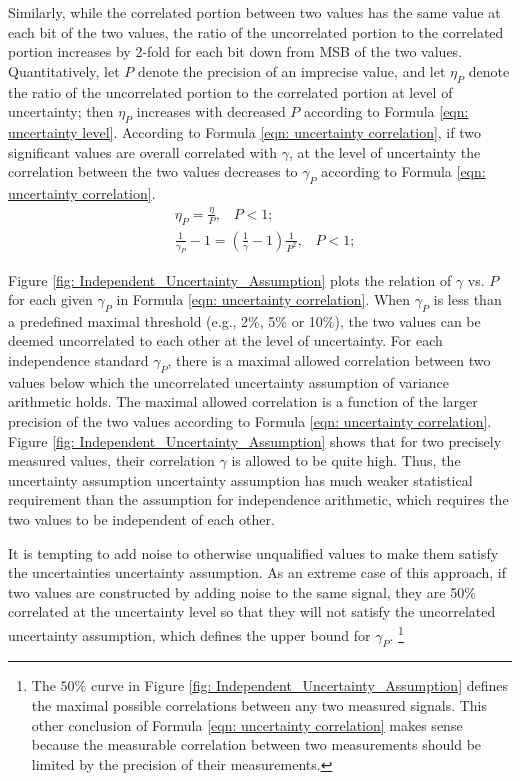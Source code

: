 \documentclass[twoside]{article}
\numberwithin{equation}{section}
\newcommand{\eqspace}{\;\;\;}
\begin{document}
Similarly, while the correlated portion between two values has the same value at each bit of the two values, the ratio of the uncorrelated portion to the correlated portion increases by 2-fold for each bit down from MSB of the two values. 
Quantitatively, let $P$ denote the precision of an imprecise value, and let $\eta_{P}$ denote the ratio of the uncorrelated portion to the correlated portion at level of uncertainty; then $\eta_{P}$ increases with decreased $P$ according to Formula \eqref{eqn: uncertainty level}. 
According to Formula \eqref{eqn: uncertainty correlation}, if two significant values are overall correlated with $\gamma$, at the level of uncertainty the correlation between the two values decreases to $\gamma_P$ according to Formula \eqref{eqn: uncertainty correlation}.
\begin{align}
\label{eqn: uncertainty level}
& \eta_{P} = \frac{\eta}{P}, \eqspace P < 1; \\
\label{eqn: uncertainty correlation}
& \frac{1}{\gamma_{P}} - 1 = \left(\frac{1}{\gamma} -1\right) \frac{1}{P^2}, \eqspace P < 1;
\end{align}

Figure \ref{fig: Independent_Uncertainty_Assumption} plots the relation of $\gamma$ vs. $P$ for each given $\gamma_{P}$ in Formula \eqref{eqn: uncertainty correlation}.  
When $\gamma_{P}$ is less than a predefined maximal threshold (e.g., 2\%, 5\% or 10\%), the two values can be deemed uncorrelated to each other at the level of uncertainty.  
For each independence standard $\gamma_{P}$, there is a maximal allowed correlation between two values below which the uncorrelated uncertainty assumption of variance arithmetic holds.  
The maximal allowed correlation is a function of the larger precision of the two values according to Formula \eqref{eqn: uncertainty correlation}.  
Figure \ref{fig: Independent_Uncertainty_Assumption} shows that for two precisely measured values, their correlation $\gamma$ is allowed to be quite high.  
Thus, the uncertainty assumption uncertainty assumption has much weaker statistical requirement than the assumption for independence arithmetic, which requires the two values to be independent of each other.

It is tempting to add noise to otherwise unqualified values to make them satisfy the uncertainties uncertainty assumption.  
As an extreme case of this approach, if two values are constructed by adding noise to the same signal, they are 50\% correlated at the uncertainty level so that they will not satisfy the uncorrelated uncertainty assumption, which defines the upper bound for $\gamma_{P}$. 
\footnote{
The $50\%$ curve in Figure \ref{fig: Independent_Uncertainty_Assumption} defines the maximal possible correlations between any two measured signals. 
This other conclusion of Formula \eqref{eqn: uncertainty correlation} makes sense because the measurable correlation between two measurements should be limited by the precision of their measurements.
}
\end{document}
